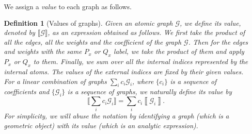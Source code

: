 \documentclass{article}
\newcommand{\1}{\mathds{1}}
\numberwithin{equation}{section}
\renewcommand{\cal}{\mathcal}
\theoremstyle{plain} %
\newtheorem{definition}[theorem]{Definition}
\theoremstyle{remark}
\newcommand{\cor}{\color{red}}
\newcommand{\nc}{\normalcolor}
\begin{document}
We assign a \emph{value} to each graph as follows.



\begin{definition}[Values of graphs]\label{ValG} 
Given an atomic graph $\mathcal G$, we define its value, denoted by $\llbracket \cal G\rrbracket$, as an expression obtained as follows. We first take the product of 
	all the edges, all the weights and the coefficient of the graph $\cal G$. %
	Then for the edges and weights with the same $P_x$ or $Q_x$ label, we take the product of them and apply $P_x$ or $Q_x$ to them. Finally, we sum over all the internal indices represented by the internal atoms. The values of the external indices are fixed by their given values. 
	For a linear combination of graphs  $\sum_i c_i \cal G_i$, where $\{c_i\}$ is a sequence of coefficients and $\{\cal G_i\}$ is a sequence of graphs, we naturally define its value by 
	$$ \Big\llbracket\sum_i c_i  \cal G_i\Big\rrbracket=\sum_i c_i \left\llbracket  \cal G_i\right\rrbracket.$$
	For simplicity, we will abuse the notation by identifying  a  graph (which is a geometric object) with its value (which is an analytic expression). 
\end{definition}
\end{document}
